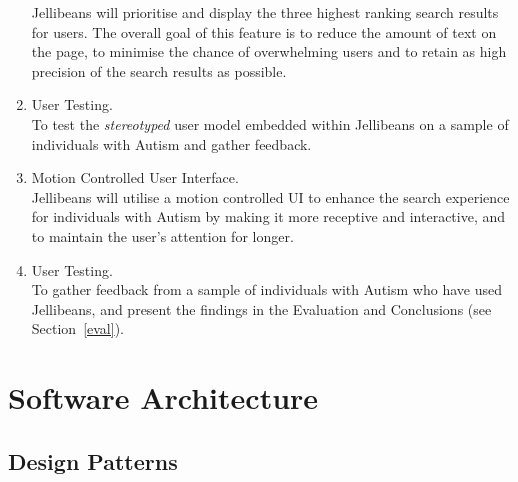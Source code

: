 \documentclass[a4paper, 11pt]{article}
\begin{document}
\begin{enumerate}
Jellibeans will prioritise and display the three highest ranking search results for users. The overall goal of this feature is to reduce the amount of text on the page, to minimise the chance of overwhelming users and to retain as high precision of the search results as possible.
\item{User Testing.}\\
To test the \textit{stereotyped} user model embedded within Jellibeans on a sample of individuals with Autism and gather feedback.
\item{Motion Controlled User Interface.}\\
Jellibeans will utilise a motion controlled UI to enhance the search experience for individuals with Autism by making it more receptive and interactive, and to maintain the user's attention for longer.
\item{User Testing.}\\
To gather feedback from a sample of individuals with Autism who have used Jellibeans, and present the findings in the Evaluation and Conclusions (see Section~\ref{eval}).
\end{enumerate}





\section{Software Architecture}

\subsection{Design Patterns}
\end{document}
